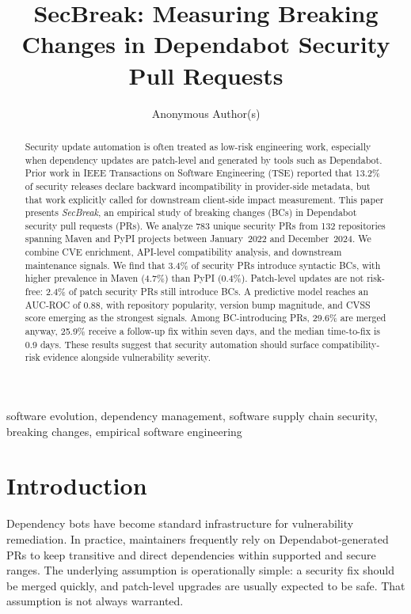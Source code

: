 \documentclass[10pt,journal]{IEEEtran}
\title{SecBreak: Measuring Breaking Changes in Dependabot Security Pull Requests}
\author{Anonymous Author(s)}
\begin{document}
\maketitle

\begin{abstract}
Security update automation is often treated as low-risk engineering work, especially when dependency updates are patch-level and generated by tools such as Dependabot. Prior work in IEEE Transactions on Software Engineering (TSE) reported that 13.2\% of security releases declare backward incompatibility in provider-side metadata, but that work explicitly called for downstream client-side impact measurement. This paper presents \textit{SecBreak}, an empirical study of breaking changes (BCs) in Dependabot security pull requests (PRs). We analyze 783 unique security PRs from 132 repositories spanning Maven and PyPI projects between January~2022 and December~2024. We combine CVE enrichment, API-level compatibility analysis, and downstream maintenance signals. We find that 3.4\% of security PRs introduce syntactic BCs, with higher prevalence in Maven (4.7\%) than PyPI (0.4\%). Patch-level updates are not risk-free: 2.4\% of patch security PRs still introduce BCs. A predictive model reaches an AUC-ROC of 0.88, with repository popularity, version bump magnitude, and CVSS score emerging as the strongest signals. Among BC-introducing PRs, 29.6\% are merged anyway, 25.9\% receive a follow-up fix within seven days, and the median time-to-fix is 0.9 days. These results suggest that security automation should surface compatibility-risk evidence alongside vulnerability severity.
\end{abstract}

\begin{IEEEkeywords}
software evolution, dependency management, software supply chain security, breaking changes, empirical software engineering
\end{IEEEkeywords}

\section{Introduction}
Dependency bots have become standard infrastructure for vulnerability remediation. In practice, maintainers frequently rely on Dependabot-generated PRs to keep transitive and direct dependencies within supported and secure ranges. The underlying assumption is operationally simple: a security fix should be merged quickly, and patch-level upgrades are usually expected to be safe. That assumption is not always warranted.
\end{document}
